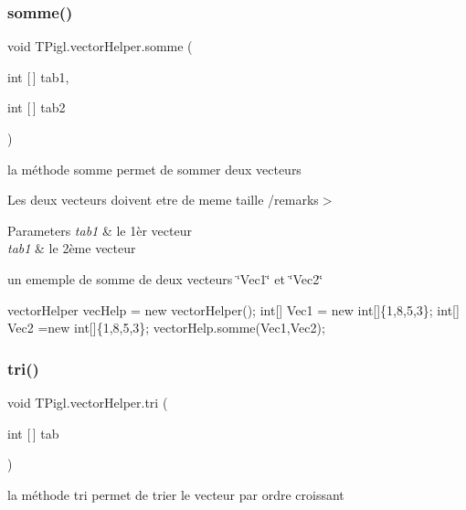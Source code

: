 \subsubsection{\texorpdfstring{somme()}{somme()}}
{\footnotesize\ttfamily void T\+Pigl.\+vector\+Helper.\+somme (\begin{DoxyParamCaption}\item[{int \mbox{[}$\,$\mbox{]}}]{tab1,  }\item[{int \mbox{[}$\,$\mbox{]}}]{tab2 }\end{DoxyParamCaption})}



la méthode somme permet de sommer deux vecteurs 

Les deux vecteurs doivent etre de meme taille /remarks$>$ 
\begin{DoxyParams}{Parameters}
{\em tab1} & le 1èr vecteur\\
\hline
{\em tab1} & le 2ème vecteur\\
\hline
\end{DoxyParams}


un ememple de somme de deux vecteurs \char`\"{}\+Vec1\char`\"{} et \char`\"{}\+Vec2\char`\"{} 
\begin{DoxyCode}
vectorHelper vecHelp = \textcolor{keyword}{new} vectorHelper();
  \textcolor{keywordtype}{int}[] Vec1 = \textcolor{keyword}{new} \textcolor{keywordtype}{int}[]\{1,8,5,3\};
  \textcolor{keywordtype}{int}[] Vec2 =\textcolor{keyword}{new} \textcolor{keywordtype}{int}[]\{1,8,5,3\};
  vectorHelp.somme(Vec1,Vec2);
\end{DoxyCode}
 \mbox{\label{class_t_pigl_1_1vector_helper_a9447a1390b9a09ade0d252d8c21a901a}} 
\subsubsection{\texorpdfstring{tri()}{tri()}}
{\footnotesize\ttfamily void T\+Pigl.\+vector\+Helper.\+tri (\begin{DoxyParamCaption}\item[{int \mbox{[}$\,$\mbox{]}}]{tab }\end{DoxyParamCaption})}



la méthode tri permet de trier le vecteur par ordre croissant 


